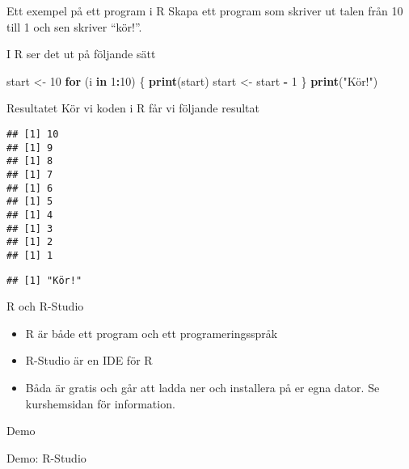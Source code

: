 \documentclass[
  10pt,
  ignorenonframetext,
]{beamer}
\newenvironment{Shaded}{\begin{snugshade}}{\end{snugshade}}
\newcommand{\ControlFlowTok}[1]{\textcolor[rgb]{0.13,0.29,0.53}{\textbf{#1}}}
\newcommand{\DecValTok}[1]{\textcolor[rgb]{0.00,0.00,0.81}{#1}}
\newcommand{\FunctionTok}[1]{\textcolor[rgb]{0.13,0.29,0.53}{\textbf{#1}}}
\newcommand{\NormalTok}[1]{#1}
\newcommand{\OtherTok}[1]{\textcolor[rgb]{0.56,0.35,0.01}{#1}}
\newcommand{\SpecialCharTok}[1]{\textcolor[rgb]{0.81,0.36,0.00}{\textbf{#1}}}
\newcommand{\StringTok}[1]{\textcolor[rgb]{0.31,0.60,0.02}{#1}}
\providecommand{\tightlist}{%
  \setlength{\itemsep}{0pt}\setlength{\parskip}{0pt}}
\begin{document}
\begin{frame}[fragile]{Ett exempel på ett program i R}
\protect\hypertarget{ett-exempel-puxe5-ett-program-i-r}{}
Skapa ett program som skriver ut talen från 10 till 1 och sen skriver
``kör!''.

\pause

I R ser det ut på följande sätt

\begin{Shaded}
\begin{Highlighting}[]
\NormalTok{start }\OtherTok{\textless{}{-}} \DecValTok{10}
\ControlFlowTok{for}\NormalTok{ (i }\ControlFlowTok{in} \DecValTok{1}\SpecialCharTok{:}\DecValTok{10}\NormalTok{) \{}
  \FunctionTok{print}\NormalTok{(start)}
\NormalTok{  start }\OtherTok{\textless{}{-}}\NormalTok{ start }\SpecialCharTok{{-}} \DecValTok{1}
\NormalTok{\}}
\FunctionTok{print}\NormalTok{(}\StringTok{"Kör!"}\NormalTok{)}
\end{Highlighting}
\end{Shaded}
\end{frame}

\begin{frame}[fragile]{Resultatet}
\protect\hypertarget{resultatet}{}
Kör vi koden i R får vi följande resultat

\begin{verbatim}
## [1] 10
## [1] 9
## [1] 8
## [1] 7
## [1] 6
## [1] 5
## [1] 4
## [1] 3
## [1] 2
## [1] 1
\end{verbatim}

\begin{verbatim}
## [1] "Kör!"
\end{verbatim}
\end{frame}

\begin{frame}{R och R-Studio}
\protect\hypertarget{r-och-r-studio}{}
\begin{itemize}
\tightlist
\item
  R är både ett program och ett programeringsspråk
\item
  R-Studio är en IDE för R
\item
  Båda är gratis och går att ladda ner och installera på er egna dator.
  Se kurshemsidan för information.
\end{itemize}
\end{frame}

\begin{frame}{Demo}
\protect\hypertarget{demo}{}
\begin{block}{Demo: R-Studio}
\protect\hypertarget{demo-r-studio}{}
\end{block}
\end{frame}
\end{document}
